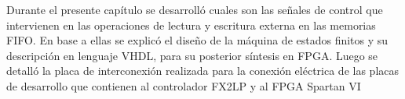 Durante el presente capítulo se desarrolló cuales son las señales de control que intervienen en las operaciones de lectura y escritura externa en las memorias FIFO. En base a ellas se explicó el diseño de la máquina de estados finitos y su descripción en lenguaje VHDL, para su posterior síntesis en FPGA.
Luego se detalló la placa de interconexión realizada para la conexión eléctrica de las placas de desarrollo que contienen al controlador FX2LP y al FPGA Spartan VI